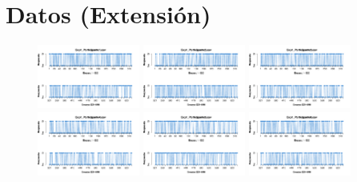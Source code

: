 
\chapter{Datos (Extensión)} %

\label{App_Data} %

\begin{figure}[th]
\centering
\includegraphics[width=0.30\textwidth]{Figures/Response_Exp1_P1} \includegraphics[width=0.30\textwidth]{Figures/Response_Exp1_P2} \includegraphics[width=0.30\textwidth]{Figures/Response_Exp1_P3}
\includegraphics[width=0.30\textwidth]{Figures/Response_Exp1_P4} \includegraphics[width=0.30\textwidth]{Figures/Response_Exp1_P5} \includegraphics[width=0.30\textwidth]{Figures/Response_Exp1_P6}

\end{figure}
